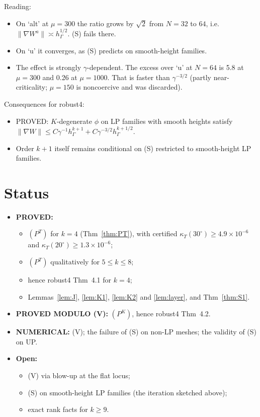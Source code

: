 \documentclass[11pt]{article}
\theoremstyle{remark}
\newcommand{\hG}{h_\Gamma}
\begin{document}
\noindent Reading:
\begin{itemize}
\item On `alt' at $\mu=300$ the ratio grows by $\sqrt2$ from $N=32$ to $64$, i.e.\ $\|\nabla W^a\|\asymp\hG^{1/2}$. (S) fails there.
\item On `u' it converges, as (S) predicts on smooth-height families.
\item The effect is strongly $\gamma$-dependent. The excess over `u' at $N=64$ is 5.8 at $\mu=300$ and 0.26 at $\mu=1000$. That is
 faster than $\gamma^{-3/2}$ (partly near-criticality; $\mu=150$ is noncoercive and was discarded).
\end{itemize}
Consequences for robust4:
\begin{itemize}
\item PROVED: $K$-degenerate $\phi$ on LP families with smooth heights satisfy $\|\nabla W\|\le C\gamma^{-1}\hG^{k+1}+C\gamma^{-3/2}\hG^{k+1/2}$.
\item Order $k+1$ itself remains conditional on (S) restricted to smooth-height LP families.
\end{itemize}

\section{Status}
\begin{itemize}
\item \textbf{PROVED:}
 \begin{itemize}
 \item $(P^T)$ for $k=4$ (Thm~\ref{thm:PT}), with certified $\kappa_T(30^\circ)\ge4.9\times10^{-6}$ and $\kappa_T(20^\circ)\ge1.3\times10^{-6}$;
 \item $(P^T)$ qualitatively for $5\le k\le8$;
 \item hence robust4 Thm~4.1 for $k=4$;
 \item Lemmas~\ref{lem:J}, \ref{lem:K1}, \ref{lem:K2} and \ref{lem:layer}, and Thm~\ref{thm:S1}.
 \end{itemize}
\item \textbf{PROVED MODULO (V):} $(P^K)$, hence robust4 Thm~4.2.
\item \textbf{NUMERICAL:} (V); the failure of (S) on non-LP meshes; the validity of (S) on \textsf{UP}.
\item \textbf{Open:}
 \begin{itemize}
 \item (V) via blow-up at the flat locus;
 \item (S) on smooth-height LP families (the iteration sketched above);
 \item exact rank facts for $k\ge9$.
 \end{itemize}
\end{itemize}
\end{document}
